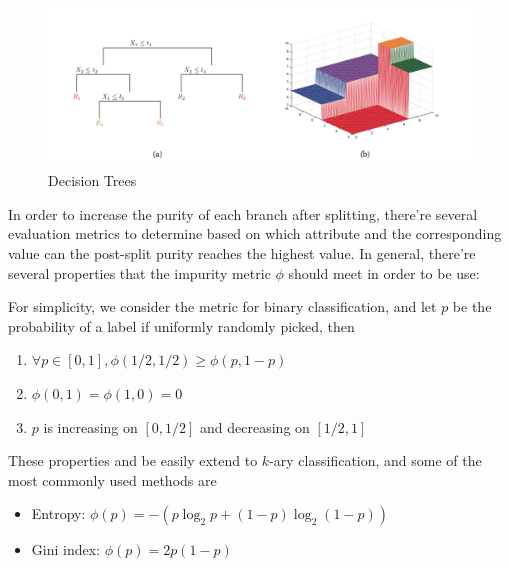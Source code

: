 \documentclass[10pt,twocolumn,letterpaper]{article}
\begin{document}
		\begin{figure}[h]
			\begin{center}
				\includegraphics[width=0.9\linewidth]{images/classificationtree}
				\caption{Decision Trees\cite{murphy_2013}}
			\end{center}
		\end{figure}
    	
    	In order to increase the purity of each branch after splitting, there're several evaluation metrics to determine based on which attribute and the corresponding value can the post-split purity reaches the highest value. In general, there're several properties that the impurity metric $\phi$ should meet in order to be use:
    	
    	For simplicity, we consider the metric for binary classification, and let $p$ be the probability of a label if uniformly randomly picked, then
    	
    	\begin{enumerate}
    		\item $\forall p \in [0, 1], \phi(1/2, 1/2) \geq \phi(p, 1 - p)$
    		\item $\phi(0, 1) = \phi(1, 0) = 0$
    		\item $p$ is increasing on $[0, 1/2]$ and decreasing on $[1/2, 1]$
    	\end{enumerate}
    
    	These properties and be easily extend to $k$-ary classification, and some of the most commonly used methods are
    	\begin{itemize}
    		\item Entropy: $\phi(p) = -(p\log_2p + (1 - p)\log_2(1 - p))$
    		\item Gini index: $\phi(p) = 2p(1 - p)$
    	\end{itemize}
    	
\end{document}

